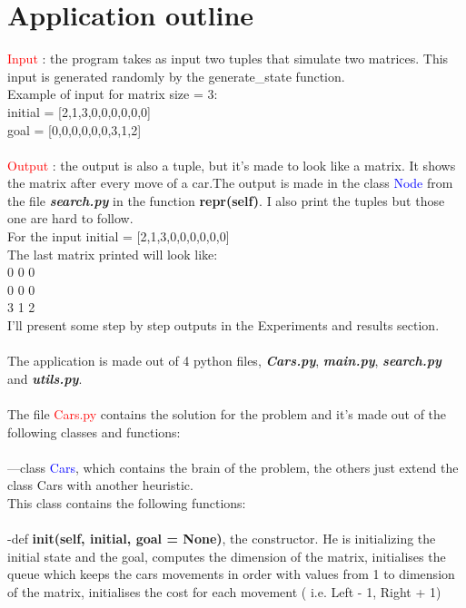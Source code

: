 \documentclass[14pt]{article}
\begin{document}
\newpage
\section*{Application outline}
\vspace{10 mm}
\textcolor{red}{Input} : the program takes as input two tuples that simulate two matrices. This input is generated randomly by the generate\_state function.\\
Example of input for matrix size = 3:\\
initial = [2,1,3,0,0,0,0,0,0]\\
goal = [0,0,0,0,0,0,3,1,2]\\\\
\textcolor{red}{Output} : the output is also a tuple, but it's made to look like a matrix. It shows the matrix after every move of a car.The output is made in the class \textcolor{blue}{Node} from the file \textbf{\textit{search.py}} in the function \textbf{repr(self)}. I also print the tuples but those one are hard to follow. \\
For the input initial = [2,1,3,0,0,0,0,0,0]\\
The last matrix printed will look like:\\
0 0 0\\
0 0 0\\
3 1 2\\
I'll present some step by step outputs in the Experiments and results section.
\\\\
The application is made out of 4 python files, \textbf{\textit{Cars.py}}, \textbf{\textit{main.py}}, \textbf{\textit{search.py}} and \textbf{\textit{utils.py}}.
\\\\
The file \textcolor{red}{Cars.py} contains the solution for the problem and it's made out of the following classes and functions:
\\
\\---class \textcolor{blue}{Cars}, which contains the brain of the problem, the others just extend the class Cars with another heuristic.
\\
This class contains the following functions:
\\ 
\\
-def \textbf{init(self, initial, goal = None)}, the constructor. He is initializing the initial state and the goal, computes the dimension of the matrix, initialises the queue which keeps the cars movements in order with values from 1 to dimension of the matrix, initialises the cost for each movement ( i.e. Left - 1, Right + 1)
\end{document}
